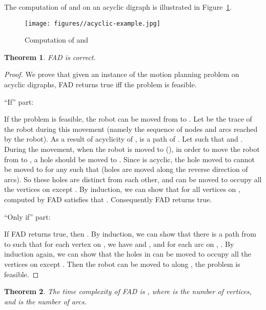 \documentclass{article}
\newtheorem{thm}{Theorem}
\begin{document}
\clearpage

The computation of  and  on an acyclic digraph is
illustrated in Figure~\ref{fig:acyclic-example}.

\begin{figure}[ht]
\centering
  \texttt{[image: figures//acyclic-example.jpg]}
  \caption{Computation of  and }\label{fig:acyclic-example}
\end{figure}



\begin{thm}
FAD is correct.
\end{thm}



\begin{proof}

We prove that given an instance of the motion planning problem on
acyclic digraphs, FAD returns true iff the problem is feasible.

\noindent ``If'' part:

If the problem is feasible, the robot can be moved from  to .
Let  be the trace of the robot during this movement (namely the
sequence of nodes and arcs reached by the robot). As a result of
acyclicity of ,  is a path of . Let  such that  and . During the movement,
when the robot is moved to (), in order to
move the robot from  to , a hole should be moved to
. Since  is acyclic, the hole moved to  cannot be
moved to  for any  such that  (holes are moved
along the reverse direction of arcs). So these holes are distinct
from each other, and can be moved to occupy all the vertices on 
except . By induction, we can show that for all vertices  on
,  computed by FAD satisfies that .
Consequently FAD returns true.

\noindent ``Only if'' part:

If FAD returns true, then . By induction, we can
show that there is a path  from  to  such that for each
vertex  on , we have  and , and for each arc  on , . By
induction again, we can show that the holes in  can be moved to
occupy all the vertices on  except . Then the robot can be
moved to  along , the problem is feasible.
\end{proof}

\begin{thm}\label{thm:acyclic-complexity}
The time complexity of FAD is , where  is the number of
vertices, and  is the number of arcs.
\end{thm}
\end{document}
